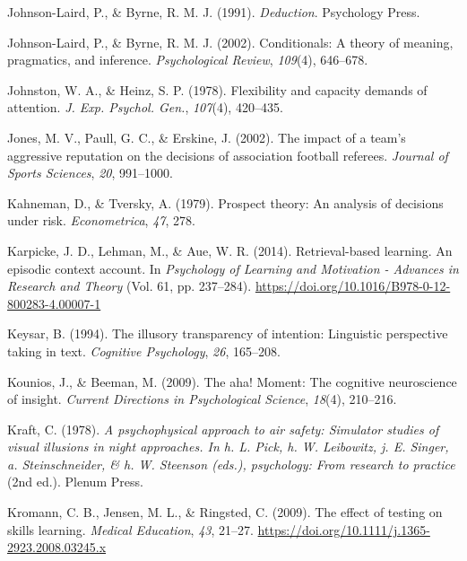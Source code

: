 \documentclass[
]{krantz}
\newlength{\cslhangindent}
\newenvironment{CSLReferences}[2] %
 {\begin{list}{}{%
  \setlength{\itemindent}{0pt}
  \setlength{\leftmargin}{0pt}
  \setlength{\parsep}{0pt}
  \ifodd #1
   \setlength{\leftmargin}{\cslhangindent}
   \setlength{\itemindent}{-1\cslhangindent}
  \fi
  \setlength{\itemsep}{#2\baselineskip}}}
 {\end{list}}
\begin{document}
\begin{CSLReferences}{1}{0}
Johnson-Laird, P., \& Byrne, R. M. J. (1991). \emph{Deduction}. Psychology Press.

Johnson-Laird, P., \& Byrne, R. M. J. (2002). Conditionals: A theory of meaning, pragmatics, and inference. \emph{Psychological Review}, \emph{109}(4), 646--678.

Johnston, W. A., \& Heinz, S. P. (1978). Flexibility and capacity demands of attention. \emph{J. Exp. Psychol. Gen.}, \emph{107}(4), 420--435.

Jones, M. V., Paull, G. C., \& Erskine, J. (2002). The impact of a team's aggressive reputation on the decisions of association football referees. \emph{Journal of Sports Sciences}, \emph{20}, 991--1000.

Kahneman, D., \& Tversky, A. (1979). Prospect theory: An analysis of decisions under risk. \emph{Econometrica}, \emph{47}, 278.

Karpicke, J. D., Lehman, M., \& Aue, W. R. (2014). Retrieval-based learning. An episodic context account. In \emph{Psychology of Learning and Motivation - Advances in Research and Theory} (Vol. 61, pp. 237--284). \url{https://doi.org/10.1016/B978-0-12-800283-4.00007-1}

Keysar, B. (1994). The illusory transparency of intention: Linguistic perspective taking in text. \emph{Cognitive Psychology}, \emph{26}, 165--208.

Kounios, J., \& Beeman, M. (2009). The aha! Moment: The cognitive neuroscience of insight. \emph{Current Directions in Psychological Science}, \emph{18}(4), 210--216.

Kraft, C. (1978). \emph{A psychophysical approach to air safety: Simulator studies of visual illusions in night approaches. In h. L. Pick, h. W. Leibowitz, j. E. Singer, a. Steinschneider, \& h. W. Steenson (eds.), psychology: From research to practice} (2nd ed.). Plenum Press.

Kromann, C. B., Jensen, M. L., \& Ringsted, C. (2009). The effect of testing on skills learning. \emph{Medical Education}, \emph{43}, 21--27. \url{https://doi.org/10.1111/j.1365-2923.2008.03245.x}


\end{CSLReferences}
\end{document}
